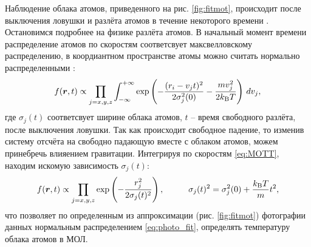 Наблюдение облака атомов, приведенного на рис. \ref{fig:fitmot}, происходит после выключения ловушки и разлёта атомов в течение некоторого времени . Остановимся подробнее на физике разлёта атомов. В начальный момент времени распределение атомов по скоростям соответсвует максвелловскому распределению, в коордиантном пространстве атомы можно считать нормально распределенными \cite{vlad}:
\begin{equation}
    f(\boldsymbol{r}, t) \propto \prod_{j=x,y,z} \int_{-\infty}^{+\infty} 
    \exp\left(
        - \frac{(r_i-v_j t)^2}{2 \sigma_j^2(0)} - \frac{m v_j^2}{2 k_{\textnormal{B}} T}
    \right)
    \, d v_j,
    \label{eq:MOTT}
\end{equation}
где $\sigma_j(t)$ соответсвует ширине облака атомов, $t$ -- время свободного разлёта, после выключения ловушки. Так как происходит свободное падение, то изменив систему отсчёта на свободно падающую вместе с облаком атомов, можем принебречь влияением гравитации. Интегрируя по скоростям \eqref{eq:MOTT}, находим искомую зависимость $\sigma_j(t)$:
\begin{equation*}
    f(\vc{r},t) \propto \prod_{j=x,y,z} \exp\left(
        - \frac{r_j^2}{2 \sigma_j(t)^2}
    \right),
    \hspace{10 mm} 
    \sigma_j(t)^2 =  \sigma_j^2(0) + \frac{\kB T}{m} t^2,
\end{equation*}
что позволяет по определенным из аппроксимации (рис. \ref{fig:fitmot}) фотографии данных нормальным распределением \eqref{eq:photo_fit}, определять температуру облака атомов в МОЛ. 
